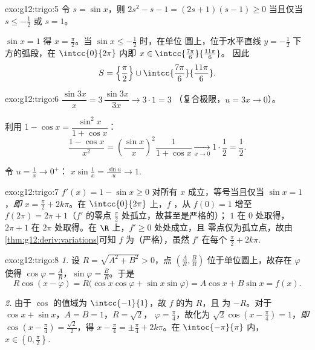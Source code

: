\begin{solution}{exo:g12:trigo:5}
令 $s = \sin x$，则 $2s^2 - s - 1 = (2s + 1)(s - 1) \geq 0$ 当且仅当
$s \leq -\frac12$ 或 $s = 1$。

$\sin x = 1$ 得 $x = \frac\pi2$。当 $\sin x \leq -\frac12$ 时，在单位
圆上，位于水平直线 $y = -\frac12$ 下方的弧段，在
$\intcc{0}{2\pi}$ 内即 $x \in \intcc{\frac{7\pi}{6}}{\frac{11\pi}{6}}$。
因此
\[
S = \left\{\frac{\pi}{2}\right\} \cup
\intcc{\frac{7\pi}{6}}{\frac{11\pi}{6}} .
\]
\end{solution}

\begin{solution}{exo:g12:trigo:6}
$\dfrac{\sin 3x}{x} = 3\,\dfrac{\sin 3x}{3x} \to 3 \cdot 1 = 3$
（复合极限，$u = 3x \to 0$）。

利用 $1 - \cos x = \dfrac{\sin^2 x}{1 + \cos x}$：
\[
\frac{1 - \cos x}{x^2}
= \left(\frac{\sin x}{x}\right)^{\!2} \frac{1}{1 + \cos x}
\xrightarrow[x\to0]{} 1 \cdot \frac12 = \frac12 .
\]

令 $u = \frac1x \to 0^+$：
$x \sin\frac1x = \frac{\sin u}{u} \to 1$.
\end{solution}

\begin{solution}{exo:g12:trigo:7}
$f'(x) = 1 - \sin x \geq 0$ 对所有 $x$ 成立，等号当且仅当
$\sin x = 1$，\emph{即} $x = \frac\pi2 + 2k\pi$。在 $\intcc{0}{2\pi}$ 上，$f$
，从 $f(0) = 1$ 增至 $f(2\pi) = 2\pi + 1$（$f'$ 的零点
$\frac{\pi}{2}$ 处孤立，故甚至是严格的）； $1$ 在
$0$ 处取得， $2\pi + 1$ 在 $2\pi$ 处取得。在 $\R$ 上，$f' \geq 0$ 处处成立，且
零点仅为孤立点，故由
\cref{thm:g12:deriv:variations}可知 $f$ 为（严格），虽然 $f'$ 在每个
$\frac\pi2 + 2k\pi$.
\end{solution}

\begin{solution}{exo:g12:trigo:8}
\emph{1.} 设 $R = \sqrt{A^2 + B^2} > 0$，点
$\left(\frac AR, \frac BR\right)$ 位于单位圆上，故存在
$\varphi$ 使得 $\cos\varphi = \frac AR$，$\sin\varphi = \frac BR$。于是
\[
R\cos(x - \varphi) = R\bigl(\cos x\cos\varphi + \sin x \sin\varphi\bigr)
= A\cos x + B\sin x = f(x).
\]

\emph{2.} 由于 $\cos$ 的值域为 $\intcc{-1}{1}$，故 $f$ 的为 $R$，且
为 $-R$。对于 $\cos x + \sin x$，$A = B = 1$，$R = \sqrt2$，
$\varphi = \frac\pi4$，故化为
$\sqrt2\cos\left(x - \frac\pi4\right) = 1$，\emph{即}
$\cos\left(x - \frac\pi4\right) = \frac{\sqrt2}{2}$，得
$x - \frac\pi4 = \pm\frac\pi4 + 2k\pi$。在 $\intoc{-\pi}{\pi}$ 内，
$x \in \left\{0, \frac\pi2\right\}$.
\end{solution}

